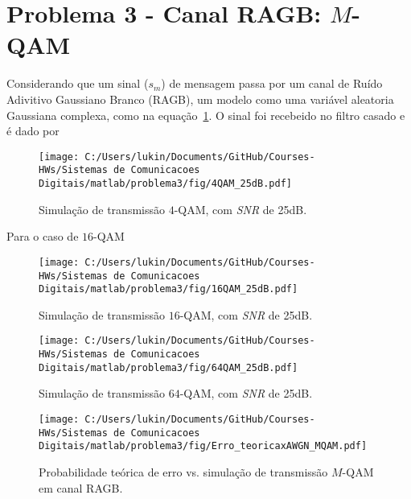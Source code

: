 \section{Problema 3 - Canal RAGB: \texorpdfstring{$M$}{M}-QAM}

Considerando que um sinal ($s_m$) de mensagem passa por um canal de Ruído Adivitivo Gaussiano Branco (RAGB), um modelo como uma variável aleatoria Gaussiana complexa, como na equação~\ref{fig:4QAM_25dB}. O sinal foi recebeido no filtro casado e é dado por

\begin{figure}[!ht]
    \centering
    \texttt{[image: C:/Users/lukin/Documents/GitHub/Courses-HWs/Sistemas de Comunicacoes Digitais/matlab/problema3/fig/4QAM\_25dB.pdf]}
    \caption{Simulação de transmissão $4$-QAM, com \textit{SNR} de 25dB.}
    \label{fig:4QAM_25dB}
\end{figure}

Para o caso de $16$-QAM

\begin{figure}[!ht]
    \centering
    \texttt{[image: C:/Users/lukin/Documents/GitHub/Courses-HWs/Sistemas de Comunicacoes Digitais/matlab/problema3/fig/16QAM\_25dB.pdf]}
    \caption{Simulação de transmissão $16$-QAM, com \textit{SNR} de 25dB.}
    \label{fig:16QAM_25dB}
\end{figure}

\begin{figure}[!ht]
    \centering
    \texttt{[image: C:/Users/lukin/Documents/GitHub/Courses-HWs/Sistemas de Comunicacoes Digitais/matlab/problema3/fig/64QAM\_25dB.pdf]}
    \caption{Simulação de transmissão $64$-QAM, com \textit{SNR} de 25dB.}
    \label{fig:64QAM_25dB}
\end{figure}


\begin{figure}[!ht]
    \centering
    \texttt{[image: C:/Users/lukin/Documents/GitHub/Courses-HWs/Sistemas de Comunicacoes Digitais/matlab/problema3/fig/Erro\_teoricaxAWGN\_MQAM.pdf]}
    \caption{Probabilidade teórica de erro vs. simulação de transmissão $M$-QAM em canal RAGB.}
    \label{fig:Erro_teoricaxAWGN_MQAM}
\end{figure}
